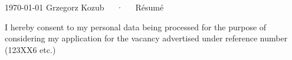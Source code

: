 \documentclass[11pt, a4paper]{awesome-cv}
\begin{document}
\makecvheader[C]

\makecvfooter
  {\today}
  {Grzegorz Kozub~~~·~~~Résumé}
  {\thepage}



%


\pagebreak







\vspace*{\fill}
I hereby consent to my personal data being processed for the purpose of considering my application for the vacancy advertised under reference number (123XX6 etc.)
%
%
%
%


\end{document}
